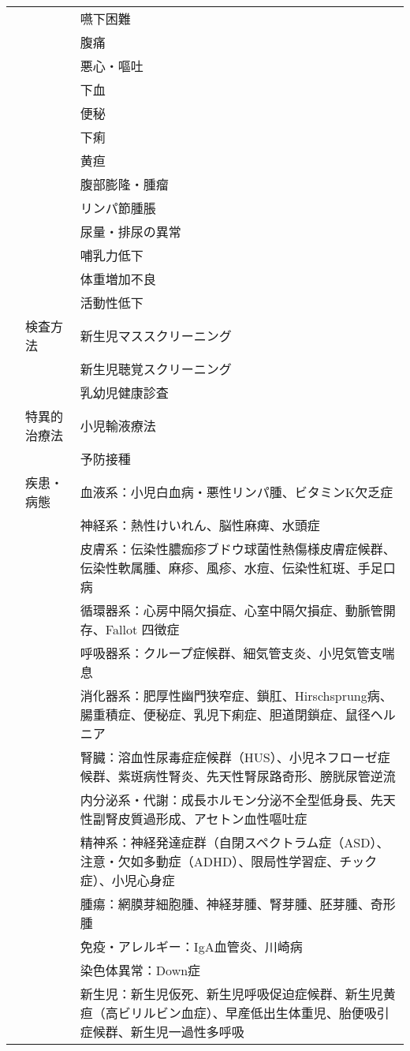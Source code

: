 \begin{xltabular}{\linewidth}{XXX}
 &  & 嚥下困難 \\
 &  & 腹痛 \\
 &  & 悪心・嘔吐 \\
 &  & 下血 \\
 &  & 便秘 \\
 &  & 下痢 \\
 &  & 黄疸 \\
 &  & 腹部膨隆・腫瘤 \\
 &  & リンパ節腫脹 \\
 &  & 尿量・排尿の異常 \\
 &  & 哺乳力低下 \\
 &  & 体重増加不良 \\
 &  & 活動性低下 \\
 & 検査方法 & 新生児マススクリーニング \\
 &  & 新生児聴覚スクリーニング \\
 &  & 乳幼児健康診査 \\
 & 特異的治療法 & 小児輸液療法 \\
 &  & 予防接種 \\
 & 疾患・病態 & 血液系：小児白血病・悪性リンパ腫、ビタミンK欠乏症 \\
 &  & 神経系：熱性けいれん、脳性麻痺、水頭症 \\
 &  & 皮膚系：伝染性膿痂疹ブドウ球菌性熱傷様皮膚症候群、伝染性軟属腫、麻疹、風疹、水痘、伝染性紅斑、手足口病 \\
 &  & 循環器系：心房中隔欠損症、心室中隔欠損症、動脈管開存、Fallot 四徴症 \\
 &  & 呼吸器系：クループ症候群、細気管支炎、小児気管支喘息 \\
 &  & 消化器系：肥厚性幽門狭窄症、鎖肛、Hirschsprung病、腸重積症、便秘症、乳児下痢症、胆道閉鎖症、鼠径ヘルニア \\
 &  & 腎臓：溶血性尿毒症症候群（HUS）、小児ネフローゼ症候群、紫斑病性腎炎、先天性腎尿路奇形、膀胱尿管逆流 \\
 &  & 内分泌系・代謝：成長ホルモン分泌不全型低身長、先天性副腎皮質過形成、アセトン血性嘔吐症 \\
 &  & 精神系：神経発達症群（自閉スペクトラム症（ASD）、注意・欠如多動症（ADHD）、限局性学習症、チック症）、小児心身症 \\
 &  & 腫瘍：網膜芽細胞腫、神経芽腫、腎芽腫、胚芽腫、奇形腫 \\
 &  & 免疫・アレルギー：IgA血管炎、川崎病 \\
 &  & 染色体異常：Down症 \\
 &  & 新生児：新生児仮死、新生児呼吸促迫症候群、新生児黄疸（高ビリルビン血症）、早産低出生体重児、胎便吸引症候群、新生児一過性多呼吸 \\

\end{xltabular}
